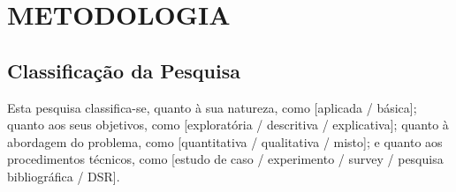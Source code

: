 %
%
%

\chapter{METODOLOGIA}
\label{cap:metodologia}



\section{Classificação da Pesquisa}


Esta pesquisa classifica-se, quanto à sua natureza, como [aplicada / básica]; quanto aos seus objetivos, como [exploratória / descritiva / explicativa]; quanto à abordagem do problema, como [quantitativa / qualitativa / misto]; e quanto aos procedimentos técnicos, como [estudo de caso / experimento / survey / pesquisa bibliográfica / DSR].

